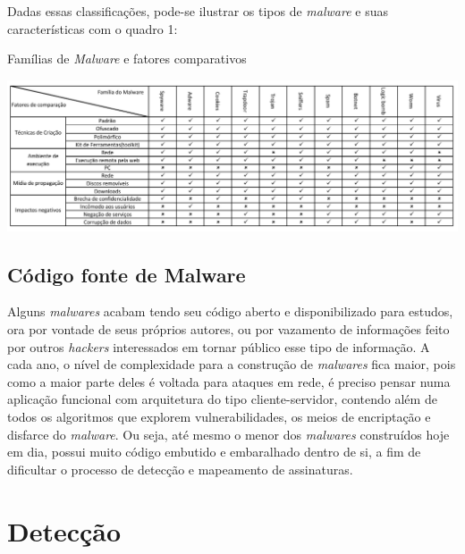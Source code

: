Dadas essas classificações, pode-se ilustrar os tipos de \textit{malware} e suas características com o quadro 1:

\begin{quadro}[h]
\caption{\small Famílias de \textit{Malware} e fatores comparativos}
\centering
\includegraphics{figs/tabela.pdf}
\label{f.tabelamalware}
\end{quadro}

\subsection{Código fonte de Malware} %
\label{ssub:exemplos_malware}

Alguns \textit{malwares} acabam tendo seu código aberto e disponibilizado para
estudos, ora por vontade de seus próprios autores, ou por vazamento de
informações feito por outros \textit{hackers} interessados em tornar público
esse tipo de informação. A cada ano, o nível de complexidade para a construção
de \textit{malwares} fica maior, pois como a maior parte deles é voltada para
ataques em rede, é preciso pensar numa aplicação funcional com arquitetura do
tipo cliente-servidor, contendo além de todos os algoritmos que explorem
vulnerabilidades, os meios de encriptação e disfarce do \textit{malware}. Ou
seja, até mesmo o menor dos \textit{malwares} construídos hoje em dia, possui
muito código embutido e embaralhado dentro de si, a fim de dificultar o processo
de detecção e mapeamento de assinaturas.

\section{Detecção}
\label{s.deteccao}

